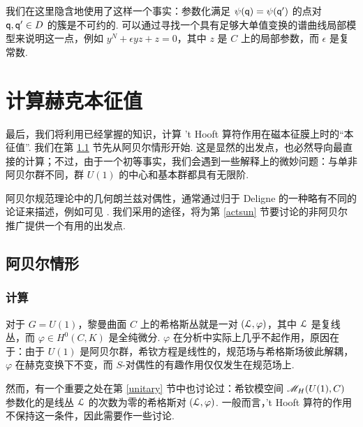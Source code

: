 我们在这里隐含地使用了这样一个事实：参数化满足 $\psi({\sf q})=\psi({\sf q}')$ 的点对 ${\sf q},{\sf q}'\in D$ 的簇是不可约的. 可以通过寻找一个具有足够大单值变换的谱曲线局部模型来说明这一点，例如 $y^N+\epsilon yz+z=0$，其中 $z$ 是 $C$ 上的局部参数，而 $\epsilon$ 是复常数.


\section{计算赫克本征值}
\label{compheck}

最后，我们将利用已经掌握的知识，计算 't Hooft 算符作用在磁本征膜上时的“本征值”. 我们在第 \ref{abcase} 节先从阿贝尔情形开始. 这是显然的出发点，也必然导向最直接的计算；不过，由于一个初等事实，我们会遇到一些解释上的微妙问题：与单非阿贝尔群不同，群 $U(1)$ 的中心和基本群都具有无限阶.

阿贝尔规范理论中的几何朗兰兹对偶性，通常通过归于 Deligne 的一种略有不同的论证来描述，例如可见 \cite{frenkel}. 我们采用的途径，将为第 \ref{actsun} 节要讨论的非阿贝尔推广提供一个有用的出发点.

\subsection{阿贝尔情形}
\label{abcase}
\subsubsection{计算}

对于 $G=U(1)$，黎曼曲面 $C$ 上的希格斯丛就是一对 $({\cal L},\varphi)$，其中 ${\cal L}$ 是复线丛，而 $\varphi\in H^0(C,K)$ 是全纯微分. $\varphi$ 在分析中实际上几乎不起作用，原因在于：由于 $U(1)$ 是阿贝尔群，希钦方程是线性的，规范场与希格斯场彼此解耦，$\varphi$ 在赫克变换下不变，而 $S$-对偶性的有趣作用仅仅发生在规范场上.

然而，有一个重要之处在第 \ref{unitary} 节中也讨论过：希钦模空间 ${{\mathscr{M}}_H}(U(1),C)$ 参数化的是线丛 ${\mathcal L}$ 的次数为零的希格斯对 $({\mathcal L},\varphi)$. 一般而言，'t Hooft 算符的作用不保持这一条件，因此需要作一些讨论.



